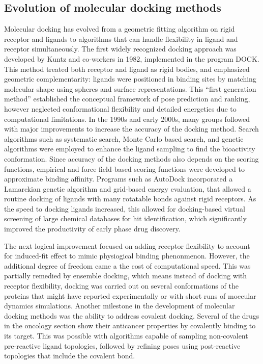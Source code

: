 \documentclass[12pt, a4paper]{article}
\begin{document}
\subsection{Evolution of molecular docking methods}
Molecular docking has evolved from a geometric fitting algorithm on rigid receptor and ligands to algorithms that can handle flexibility in ligand and receptor simultaneously. The first widely recognized docking approach was developed by Kuntz and co‑workers in 1982, implemented in the program DOCK.\cite{CH1_6} This method treated both receptor and ligand as rigid bodies, and emphasized geometric complementarity: ligands were positioned in binding sites by matching molecular shape using spheres and surface representations. This “first generation method” established the conceptual framework of pose prediction and ranking, however neglected conformational flexibility and detailed energetics due to computational limitations.
In the 1990s and early 2000s, many groups followed with major improvements to increase the accuracy of the docking method. Search algorithms such as systematic search, Monte Carlo based search, and genetic algorithms were employed to enhance the ligand sampling to find the bioactivity conformation. Since accuracy of the docking methods also depends on the scoring functions, empirical and force field‑based scoring functions were developed to approximate binding affinity.\cite{CH1_7, CH1_8} Programs such as AutoDock incorporated a Lamarckian genetic algorithm and grid‑based energy evaluation, that allowed a routine docking of ligands with many rotatable bonds against rigid receptors.\cite{CH1_9} As the speed to docking ligands increased, this allowed for docking-based virtual screening of large chemical databases for hit identification, which significantly improved the productivity of early phase drug discovery. 

The next logical improvement focused on adding receptor flexibility to account for induced-fit effect to mimic physiogical binding phenonmenon. However, the additional degree of freedom came a the cost of computational speed\cite{CH1_8}. This was partially remedied by ensemble docking, which means instead of docking with receptor flexibility, docking was carried out on several conformations of the proteins that might have reported experimentally or with short runs of moecular dynamics simulations. 
Another milestone in the development of molecular docking methods was the ability to address covalent docking. Several of the drugs in the oncology section show their anticancer properties by covalently binding to its target. This was possible with algorithms capable of sampling non-covalent pre-reactive ligand topologies, followed by refining poses using post-reactive topologies that include the covalent bond\cite{CH1_11,CH1_12}.
\end{document}
